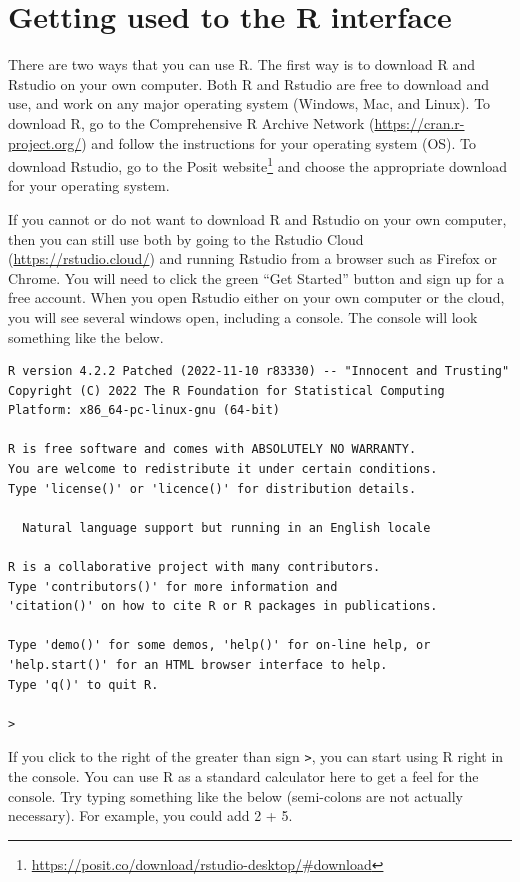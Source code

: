 \documentclass[
]{scrbook}
\begin{document}
\hypertarget{getting-used-to-the-r-interface}{%
\section{Getting used to the R interface}\label{getting-used-to-the-r-interface}}

There are two ways that you can use R.
The first way is to download R and Rstudio on your own computer.
Both R and Rstudio are free to download and use, and work on any major operating system (Windows, Mac, and Linux).
To download R, go to the Comprehensive R Archive Network (\url{https://cran.r-project.org/}) and follow the instructions for your operating system (OS).
To download Rstudio, go to the Posit website\footnote{\url{https://posit.co/download/rstudio-desktop/\#download}} and choose the appropriate download for your operating system.

If you cannot or do not want to download R and Rstudio on your own computer, then you can still use both by going to the Rstudio Cloud (\url{https://rstudio.cloud/}) and running Rstudio from a browser such as Firefox or Chrome.
You will need to click the green ``Get Started'' button and sign up for a free account.
When you open Rstudio either on your own computer or the cloud, you will see several windows open, including a console.
The console will look something like the below.

\begin{verbatim}
R version 4.2.2 Patched (2022-11-10 r83330) -- "Innocent and Trusting"
Copyright (C) 2022 The R Foundation for Statistical Computing
Platform: x86_64-pc-linux-gnu (64-bit)

R is free software and comes with ABSOLUTELY NO WARRANTY.
You are welcome to redistribute it under certain conditions.
Type 'license()' or 'licence()' for distribution details.

  Natural language support but running in an English locale

R is a collaborative project with many contributors.
Type 'contributors()' for more information and
'citation()' on how to cite R or R packages in publications.

Type 'demo()' for some demos, 'help()' for on-line help, or
'help.start()' for an HTML browser interface to help.
Type 'q()' to quit R.

> 
\end{verbatim}

If you click to the right of the greater than sign \texttt{\textgreater{}}, you can start using R right in the console.
You can use R as a standard calculator here to get a feel for the console.
Try typing something like the below (semi-colons are not actually necessary).
For example, you could add 2 + 5.
\end{document}
